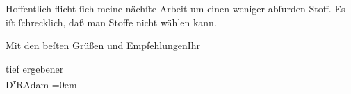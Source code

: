 \pstart
           Hoffentlich flicht{ }ſich meine nächſte Arbeit um einen weniger abſurden Stoff. Es iſt{ }ſchrecklich, daß man Stoffe nicht wählen kann.\pend
           
\pstart
           Mit den beſten Grüßen und Empfehlungen\hspace*{1.5em}Ihr\pend
           
\pstart
           tief ergebener{\\[\baselineskip]}\spacefill\mbox{D\textsuperscript{r}RAdam}\pend
           \leftskip=0em{}\endnumbering{}  \newcommand{\dateiname}{L02500}\newcommand{\titel}{Robert Adam an Arthur Schnitzler, 11. 5. 1928}\newcommand{\editorInnen}{Martin Anton Müller und Gerd-Hermann Susen}
